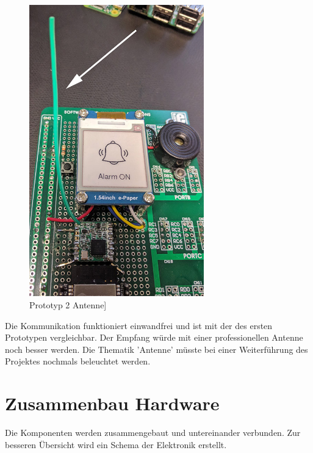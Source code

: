 \documentclass[11pt,english,german]{report}
\theoremstyle{definition}
\begin{document}
\begin{figure}[H]
	\centering
	\includegraphics[width=0.675\textwidth]{img/prototype/antenna.jpg}
	\caption[Prototyp 2 Antenne]
	{Prototyp 2 Antenne]}
\end{figure}
\noindent
Die Kommunikation funktioniert einwandfrei und ist mit der des ersten Prototypen vergleichbar. Der Empfang würde mit einer professionellen Antenne noch besser werden. Die Thematik 'Antenne' müsste bei einer Weiterführung des Projektes nochmals beleuchtet werden.
\newpage
\section{Zusammenbau Hardware}
Die Komponenten werden zusammengebaut und untereinander verbunden. Zur besseren Übersicht wird ein Schema  der Elektronik erstellt.
\end{document}
